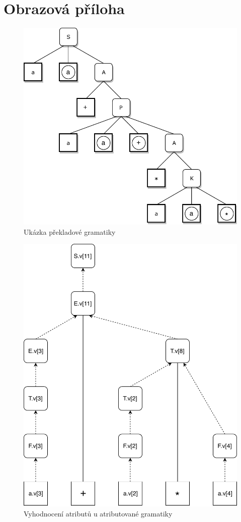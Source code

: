 




\appendix

\cleardoublepage
\chapter{Obrazová příloha}
	\begin{figure}				
		\centering
		\includegraphics[width=0.8\linewidth]{img/PrekladovaGramatika}
		\caption{Ukázka překladové gramatiky}
		\label{fig:translateGrammar}
	\end{figure}
	\begin{figure}				
		\centering
		\includegraphics[width=0.8\linewidth]{img/AttributedArithmetic}
		\caption{Vyhodnocení atributů u atributované gramatiky}
		\label{fig:attributedGrammar}
	\end{figure}

